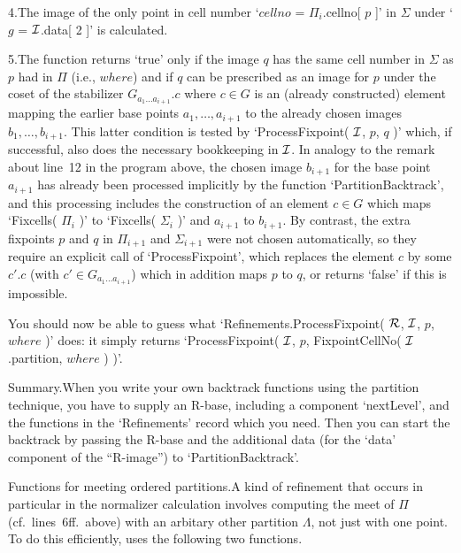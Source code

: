 4.\enspace  The image of  the  only  point  in  cell number  `$cellno$  =
$\Pi_i$.cellno[ $p$  ]' in $\Sigma$  under `$g$ = $\cal  I$.data[ 2 ]' is
calculated.

5.\enspace The function returns `true' only if the image $q$ has the same
cell  number in $\Sigma$ as  $p$ had in $\Pi$  (i.e., $where$) and if $q$
can be prescribed as an image  for $p$ under  the coset of the stabilizer
$G_{a_1\ldots   a_{i+1}}.c$ where $c\in  G$   is an (already constructed)
element mapping the   earlier base  points $a_1,\ldots,a_{i+1}$  to   the
already  chosen  images  $b_1,\ldots,b_{i+1}$. This   latter condition is
tested by `ProcessFixpoint(  $\cal I$, $p$,  $q$ )' which, if successful,
also does the necessary bookkeeping in $\cal I$. In analogy to the remark
about  line~12 in the  program above, the  chosen image $b_{i+1}$ for the
base point   $a_{i+1}$  has  already  been   processed implicitly  by the
function  `PartitionBacktrack',   and    this   processing   includes the
construction  of an element $c\in G$  which maps `Fixcells( $\Pi_i$ )' to
`Fixcells( $\Sigma_i$  )' and $a_{i+1}$   to $b_{i+1}$. By contrast,  the
extra fixpoints $p$  and $q$ in  $\Pi_{i+1}$ and $\Sigma_{i+1}$  were not
chosen automatically,     so   they  require   an    explicit   call   of
`ProcessFixpoint', which  replaces the element  $c$ by some  $c'.c$ (with
$c'\in G_{a_1\ldots  a_{i+1}}$)  which in  addition  maps $p$  to $q$, or
returns `false' if this is impossible.

You should now be  able to guess what `Refinements.ProcessFixpoint( $\cal
R$, $\cal I$,  $p$, $where$ )' does:  it simply returns `ProcessFixpoint(
$\cal I$, $p$, FixpointCellNo( $\cal I$.partition, $where$ ) )'.

\medskip%
{\bsf  Summary.}\quad When you write  your  own backtrack functions using
the  partition technique,  you  have  to  supply  an R-base, including  a
component `nextLevel', and   the  functions in the   `Refinements' record
which  you need. Then  you can start  the backtrack by passing the R-base
and the additional data (for the  `data' component of the ``R-image'') to
`PartitionBacktrack'.

\medskip%
{\bsf  Functions  for  meeting    ordered  partitions.}\quad A   kind  of
refinement that   occurs  in particular  in   the  normalizer calculation
involves computing  the  meet of $\Pi$  (cf.\ lines~6ff.\  above) with an
arbitary other partition  $\Lambda$, not just  with one point. To do this
efficiently, {\GAP} uses the following two functions.


